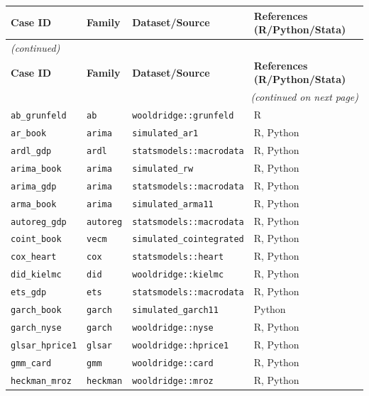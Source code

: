 {\footnotesize\setlength{\tabcolsep}{4pt}%
\begin{longtable}{llll}
\toprule
\label{tab:validation_matrix}
\textbf{Case ID} & \textbf{Family} & \textbf{Dataset/Source} & \textbf{References (R/Python/Stata)} \\
\midrule
\endfirsthead
\multicolumn{4}{l}{\footnotesize\itshape (continued)} \\[2pt]
\toprule
\textbf{Case ID} & \textbf{Family} & \textbf{Dataset/Source} & \textbf{References (R/Python/Stata)} \\
\midrule
\endhead
\midrule
\multicolumn{4}{r}{\footnotesize\itshape (continued on next page)} \\
\endfoot
\bottomrule
\endlastfoot
%
\texttt{ab\_grunfeld} & \texttt{ab} & \texttt{wooldridge::grunfeld} & R \\
\texttt{ar\_book} & \texttt{arima} & \texttt{simulated\_ar1} & R, Python \\
\texttt{ardl\_gdp} & \texttt{ardl} & \texttt{statsmodels::macrodata} & R, Python \\
\texttt{arima\_book} & \texttt{arima} & \texttt{simulated\_rw} & R, Python \\
\texttt{arima\_gdp} & \texttt{arima} & \texttt{statsmodels::macrodata} & R, Python \\
\texttt{arma\_book} & \texttt{arima} & \texttt{simulated\_arma11} & R, Python \\
\texttt{autoreg\_gdp} & \texttt{autoreg} & \texttt{statsmodels::macrodata} & R, Python \\
\texttt{coint\_book} & \texttt{vecm} & \texttt{simulated\_cointegrated} & R, Python \\
\texttt{cox\_heart} & \texttt{cox} & \texttt{statsmodels::heart} & R, Python \\
\texttt{did\_kielmc} & \texttt{did} & \texttt{wooldridge::kielmc} & R, Python \\
\texttt{ets\_gdp} & \texttt{ets} & \texttt{statsmodels::macrodata} & R, Python \\
\texttt{garch\_book} & \texttt{garch} & \texttt{simulated\_garch11} & Python \\
\texttt{garch\_nyse} & \texttt{garch} & \texttt{wooldridge::nyse} & R, Python \\
\texttt{glsar\_hprice1} & \texttt{glsar} & \texttt{wooldridge::hprice1} & R, Python \\
\texttt{gmm\_card} & \texttt{gmm} & \texttt{wooldridge::card} & R, Python \\
\texttt{heckman\_mroz} & \texttt{heckman} & \texttt{wooldridge::mroz} & R, Python \\

\end{longtable}}
